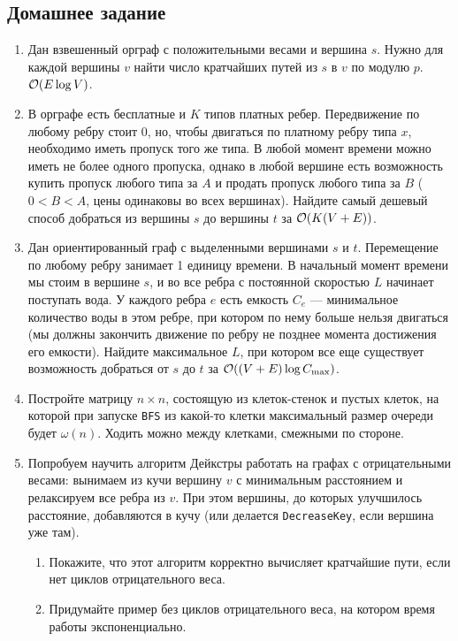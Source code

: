 \subsection{Домашнее задание}
\begin{enumerate}
  \item
    Дан взвешенный орграф с положительными весами и вершина $s$.
    Нужно для каждой вершины $v$ найти число кратчайших путей из $s$ в $v$ по модулю $p$. $\mathcal{O}(E \log V)$.

  \item
    В орграфе есть бесплатные и $K$ типов платных ребер. Передвижение
    по любому ребру стоит $0$, но, чтобы двигаться по платному ребру
    типа $x$, необходимо иметь пропуск того же типа. В любой момент
    времени можно иметь не более одного пропуска, однако в любой
    вершине есть возможность купить пропуск любого типа за $A$ и
    продать пропуск любого типа за $B$ ($0 < B < A$, цены одинаковы
    во всех вершинах). Найдите самый дешевый способ добраться из вершины
    $s$ до вершины $t$ за $\mathcal{O}(K (V + E))$.

  \item
    Дан ориентированный граф с выделенными вершинами $s$ и $t$. Перемещение по любому ребру занимает 1 единицу времени.
    В начальный момент времени мы стоим в вершине $s$, и во все ребра с постоянной скоростью $L$ начинает поступать вода.
    У каждого ребра $e$ есть емкость $C_e$ --- минимальное количество воды в этом ребре, при котором по нему больше
    нельзя двигаться (мы должны закончить движение по ребру не позднее момента достижения его емкости). Найдите
    максимальное $L$, при котором все еще существует возможность добраться от $s$ до $t$ за $\mathcal{O}((V + E)\log{C_{\max}})$.

  \item
    Постройте матрицу $n \times n$, состоящую из клеток-стенок и пустых клеток,
    на которой при запуске \texttt{BFS} из какой-то клетки максимальный
    размер очереди будет $\omega(n)$. Ходить можно между клетками, смежными по стороне.

  \item
    Попробуем научить алгоритм Дейкстры работать на графах с отрицательными весами: вынимаем из кучи вершину $v$
    с минимальным расстоянием и релаксируем все ребра из $v$. При этом вершины, до которых улучшилось расстояние,
    добавляются в кучу (или делается \texttt{DecreaseKey}, если вершина уже там).
    \begin{enumerate}
      \item Покажите, что этот алгоритм корректно вычисляет кратчайшие пути, если нет циклов отрицательного веса.
      \item Придумайте пример без циклов отрицательного веса, на котором время работы экспоненциально.
    \end{enumerate}


\end{enumerate}
